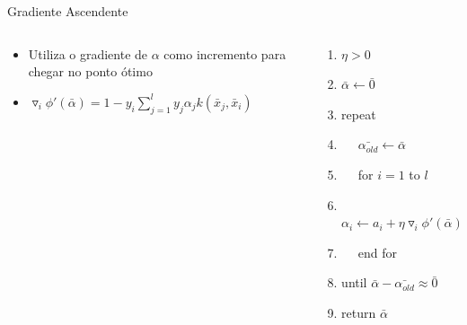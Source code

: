 \documentclass{beamer}
\begin{document}
\begin{frame}{Gradiente Ascendente}
\begin{columns}
\begin{column}{0.49\textwidth}
    \begin{itemize}
        \item Utiliza o gradiente de $\alpha$ como incremento para chegar no ponto ótimo
        \item $\triangledown_i {\phi}'(\bar{\alpha}) = 1-y_i\sum_{j=1}^ly_j\alpha_jk(\bar{x}_j,\bar{x}_i)$
    \end{itemize}
\end{column}
\begin{column}{0.49\textwidth}
\begin{enumerate}
    \item $\eta>0$
    \item $\bar{\alpha} \leftarrow \bar{0}$
    \item repeat
    \item $\quad$ $\bar{\alpha_{old}} \leftarrow \bar{\alpha}$
    \item $\quad$ for $i=1$ to $l$
    \item $\quad$ $\quad$ $\quad$ $\alpha_i \leftarrow a_i + \eta \triangledown_i {\phi}'(\bar{\alpha})$
    \item $\quad$ end for
    \item until $\bar{\alpha}-\bar{\alpha_{old}}\approx \bar{0}$
    \item return $\bar{\alpha}$
\end{enumerate}
\end{column}
\end{columns}
\end{frame}
\end{document}
